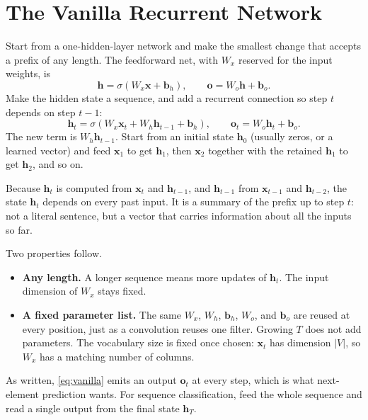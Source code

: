 \documentclass[11pt]{article}
\begin{document}
\section{The Vanilla Recurrent Network}
\label{sec:vanilla}

Start from a one-hidden-layer network and make the smallest change that
accepts a prefix of any length. The feedforward net, with \(W_x\) reserved
for the input weights, is
\[
\mathbf{h}=\sigma(W_x\mathbf{x}+\mathbf{b}_h),
\qquad
\mathbf{o}=W_o\mathbf{h}+\mathbf{b}_o.
\]
Make the hidden state a sequence, and add a recurrent connection so step
\(t\) depends on step \(t-1\):
\begin{equation}
\label{eq:vanilla}
\mathbf{h}_t
=
\sigma(W_x\mathbf{x}_t+W_h\mathbf{h}_{t-1}+\mathbf{b}_h),
\qquad
\mathbf{o}_t
=
W_o\mathbf{h}_t+\mathbf{b}_o.
\end{equation}
The new term is \(W_h\mathbf{h}_{t-1}\). Start from an initial state
\(\mathbf{h}_0\) (usually zeros, or a learned vector) and feed
\(\mathbf{x}_1\) to get \(\mathbf{h}_1\), then \(\mathbf{x}_2\) together
with the retained \(\mathbf{h}_1\) to get \(\mathbf{h}_2\), and so on.

Because \(\mathbf{h}_t\) is computed from \(\mathbf{x}_t\) and
\(\mathbf{h}_{t-1}\), and \(\mathbf{h}_{t-1}\) from \(\mathbf{x}_{t-1}\) and
\(\mathbf{h}_{t-2}\), the state \(\mathbf{h}_t\) depends on every past
input. It is a summary of the prefix up to step \(t\): not a literal
sentence, but a vector that carries information about all the inputs so far.

Two properties follow.
\begin{itemize}[leftmargin=*]
  \item \textbf{Any length.} A longer sequence means more updates of
        \(\mathbf{h}_t\). The input dimension of \(W_x\) stays fixed.
  \item \textbf{A fixed parameter list.} The same \(W_x\), \(W_h\),
        \(\mathbf{b}_h\), \(W_o\), and \(\mathbf{b}_o\) are reused at every
        position, just as a convolution reuses one filter. Growing \(T\)
        does not add parameters. The vocabulary size is fixed once chosen:
        \(\mathbf{x}_t\) has dimension \(|V|\), so \(W_x\) has a matching
        number of columns.
\end{itemize}

As written, \eqref{eq:vanilla} emits an output \(\mathbf{o}_t\) at every
step, which is what next-element prediction wants. For sequence
classification, feed the whole sequence and read a single output from the
final state \(\mathbf{h}_T\).
\end{document}
